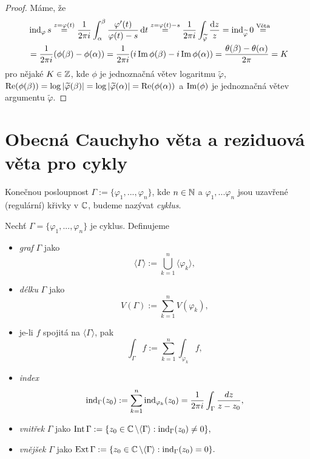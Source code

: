 \begin{proof}
Máme, že
\begin{equation*}
\begin{aligned}
&\operatorname{ind}_\varphi s\stackrel{z=\varphi(t)}{=}\frac{1}{2 \pi i}\int_\alpha^\beta \frac{\varphi'(t)}{\varphi(t)-s} \mathop{}\!\mathrm{d} t \stackrel{z=\varphi(t)-s}{=}
\frac{1}{2 \pi i} \int_{\widetilde{\varphi}} \frac{\mathop{}\!\mathrm{d} z}{z}=
\operatorname{ind}_{\widetilde{\varphi}}0\stackrel{\text{Věta}}{=}\\ &=  \frac{1}{2 \pi i}(\phi(\beta)-\phi(\alpha))=\frac{1}{2 \pi i}(i \operatorname{Im} \phi(\beta)-i \operatorname{Im} \phi(\alpha))=\frac{\theta(\beta)-\theta(\alpha)}{2 \pi}=K
\end{aligned}
\end{equation*}
pro nějaké $K \in \operatorname{\mathbb{Z}}$, kde $\phi$ je jednoznačná větev logaritmu $\widetilde{\varphi}$, $\operatorname{Re}(\phi(\beta)) =\log |\widetilde{\varphi}(\beta)|=\log |\widetilde{\varphi}(\alpha)|=\operatorname{Re}(\phi(\alpha)) $ a $\operatorname{Im}(\phi)$ je jednoznačná větev argumentu $\widetilde{\varphi}$.
\end{proof}

\section{Obecná Cauchyho věta a reziduová věta pro cykly}

\begin{definition}
Konečnou posloupnost $\Gamma:=\{\varphi_1, ... ,\varphi_n\}$, kde $n\in\operatorname{\mathbb{N}}$ a $\varphi_1, ... \varphi_n$ jsou uzavřené (regulární) křivky v $\operatorname{\mathbb{C}} $, budeme nazývat \emph{cyklus}.
\end{definition}

\begin{notation}
Nechť $\Gamma = \{\varphi_1, ... ,\varphi_n\}$ je cyklus. Definujeme
\begin{itemize}
    \item \emph{graf} $\Gamma$ jako $$\langle\Gamma\rangle:=\bigcup_{k=1}^n \langle\varphi_k\rangle,$$
    \item \emph{délku} $\Gamma$ jako $$V\left(\Gamma\right):=\sum_{k=1}^n V(\varphi_k),$$ 
    \item je-li $f$ spojitá na $\langle\Gamma\rangle$, pak $$\int_\Gamma f := \sum_{k=1}^n \int_{\varphi_k}f,$$
    \item \emph{index} $$\operatorname{ind}_\Gamma(z_0):=\sum_{k=1}^n \operatorname{ind}_{\varphi_k}(z_0) = \frac{1}{2\pi i}\int_\Gamma \frac{dz}{z-z_0},$$
    \item \emph{vnitřek} $\Gamma$ jako $\operatorname{Int}\Gamma:=\{z_0\in\operatorname{\mathbb{C}} \setminus\langle\Gamma\rangle: \operatorname{ind}_\Gamma(z_0)\neq 0\},$
    \item \emph{vnějšek} $\Gamma$ jako $\operatorname{Ext} \Gamma:=\{z_0\in\operatorname{\mathbb{C}} \setminus\langle\Gamma\rangle: \operatorname{ind}_\Gamma(z_0)=0\}.$
\end{itemize}
\end{notation}

